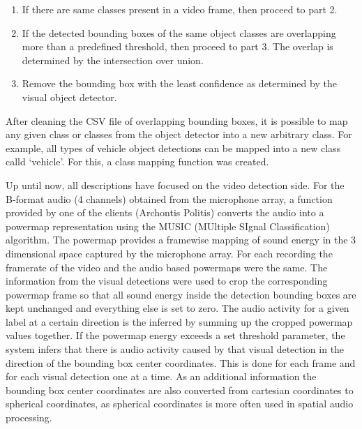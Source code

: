 \begin{enumerate}
    \item If there are same classes present in a video frame, then proceed to part 2.
    \item If the detected bounding boxes of the same object classes are overlapping more than a predefined threshold, then proceed to part 3. The overlap is determined by the intersection over union.
    \item Remove the bounding box with the least confidence as determined by the visual object detector.
\end{enumerate}

After cleaning the CSV file of overlapping bounding boxes, it is possible to map any given class or classes from the object detector into a new arbitrary class. For example, all types of vehicle object detections can be mapped into a new class calld `vehicle'. For this, a class mapping function was created.

Up until now, all descriptions have focused on the video detection side. For the B-format audio (4 channels) obtained from the microphone array, a function provided by one of the clients (Archontis Politis) converts the audio into a powermap representation using the MUSIC (MUltiple SIgnal Classification) algorithm. The powermap provides a framewise mapping of sound energy in the 3 dimensional space captured by the microphone array. For each recording the framerate of the video and the audio based powermaps were the same. The information from the visual detections were used to crop the corresponding powermap frame so that all sound energy inside the detection bounding boxes are kept unchanged and everything else is set to zero. The audio activity for a given label at a certain direction is the inferred by summing up the cropped powermap values together. If the powermap energy exceeds a set threshold parameter, the system infers that there is audio activity caused by that visual detection in the direction of the bounding box center coordinates. This is done for each frame and for each visual detection one at a time. As an additional information the bounding box center coordinates are also converted from cartesian coordinates to spherical coordinates, as spherical coordinates is more often used in spatial audio processing.

